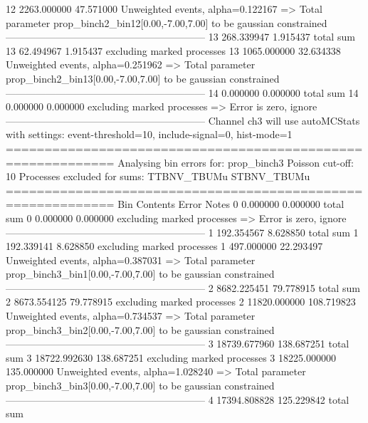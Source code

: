 12         2263.000000     47.571000       Unweighted events, alpha=0.122167
  => Total parameter prop_binch2_bin12[0.00,-7.00,7.00] to be gaussian constrained
------------------------------------------------------------
13         268.339947      1.915437        total sum                     
13         62.494967       1.915437        excluding marked processes    
13         1065.000000     32.634338       Unweighted events, alpha=0.251962
  => Total parameter prop_binch2_bin13[0.00,-7.00,7.00] to be gaussian constrained
------------------------------------------------------------
14         0.000000        0.000000        total sum                     
14         0.000000        0.000000        excluding marked processes    
  => Error is zero, ignore      
------------------------------------------------------------
Channel ch3 will use autoMCStats with settings: event-threshold=10, include-signal=0, hist-mode=1
============================================================
Analysing bin errors for: prop_binch3
Poisson cut-off: 10
Processes excluded for sums: TTBNV_TBUMu STBNV_TBUMu
============================================================
Bin        Contents        Error           Notes                         
0          0.000000        0.000000        total sum                     
0          0.000000        0.000000        excluding marked processes    
  => Error is zero, ignore      
------------------------------------------------------------
1          192.354567      8.628850        total sum                     
1          192.339141      8.628850        excluding marked processes    
1          497.000000      22.293497       Unweighted events, alpha=0.387031
  => Total parameter prop_binch3_bin1[0.00,-7.00,7.00] to be gaussian constrained
------------------------------------------------------------
2          8682.225451     79.778915       total sum                     
2          8673.554125     79.778915       excluding marked processes    
2          11820.000000    108.719823      Unweighted events, alpha=0.734537
  => Total parameter prop_binch3_bin2[0.00,-7.00,7.00] to be gaussian constrained
------------------------------------------------------------
3          18739.677960    138.687251      total sum                     
3          18722.992630    138.687251      excluding marked processes    
3          18225.000000    135.000000      Unweighted events, alpha=1.028240
  => Total parameter prop_binch3_bin3[0.00,-7.00,7.00] to be gaussian constrained
------------------------------------------------------------
4          17394.808828    125.229842      total sum                     
